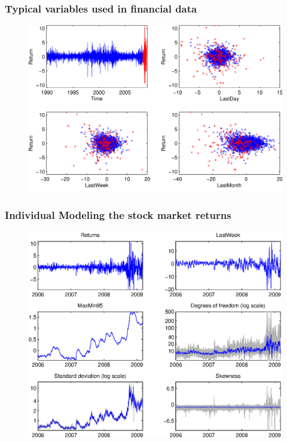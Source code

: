 \documentclass{beamer}
\begin{document}
\begin{frame}
  \frametitle{Typical variables used in financial data}
  \begin{figure}
    \centering
    \includegraphics[height=0.8\textheight]{SP500}
  \end{figure}
\end{frame}


\begin{frame}
  \frametitle{Individual Modeling the stock market returns}
  \begin{figure}
    \centering
    \includegraphics[height=0.9\textheight]{MomentPlotSP500}
  \end{figure}
\end{frame}
\end{document}

